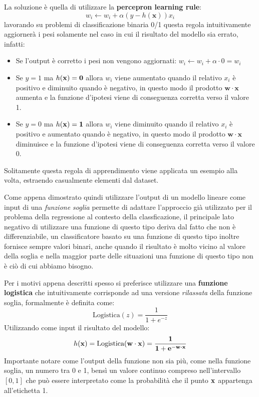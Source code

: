 \documentclass[../../main.tex]{subfiles}
\begin{document}
    La soluzione è quella di utilizzare la \textbf{percepron learning rule}:
    \[w_i \leftarrow w_i + \alpha (y - h(\boldsymbol{x})) x_i\]
    lavorando su problemi di classificazione binaria 0/1 questa regola intuitivamente aggiornerà i pesi solamente nel caso in cui il risultato del modello sia errato, infatti:
    \begin{itemize}
        \item Se l'output è corretto i pesi non vengono aggiornati: $w_i \leftarrow w_i + \alpha \cdot 0 = w_i$
        \item Se $y = 1$ ma $h(\bf{x}) = 0$ allora $w_i$ viene aumentato quando il relativo $x_i$ è positivo e diminuito quando è negativo, in questo modo il prodotto $\boldsymbol{w} \cdot \boldsymbol{x}$ aumenta e la funzione d'ipotesi viene di conseguenza corretta  verso il valore 1.
        \item Se $y = 0$ ma $h(\bf{x}) = 1$ allora $w_i$ viene diminuito quando il relativo $x_i$ è positivo e aumentato quando è negativo, in questo modo il prodotto $\boldsymbol{w} \cdot \boldsymbol{x}$ diminuisce e la funzione d'ipotesi viene di conseguenza corretta verso il valore 0.
    \end{itemize}
    Solitamente questa regola di apprendimento viene applicata un esempio alla volta, estraendo casualmente elementi dal dataset.

    Come appena dimostrato quindi utilizzare l'output di un modello lineare come input di una \textit{funzione soglia} permette di adattare l'approccio già utilizzato per il problema della regressione al contesto della classficazione, il principale lato negativo di utilizzare una funzione di questo tipo deriva dal fatto che non è differenziabile, un classificatore basato su una funzione di questo tipo inoltre fornisce sempre valori binari, anche quando il risultato è molto vicino al valore della soglia e nella maggior parte delle situazioni una funzione di questo tipo non è ciò di cui abbiamo bisogno.

    Per i motivi appena descritti spesso si preferisce utilizzare una \textbf{funzione logistica} che intuitivamente corrisponde ad una versione \textit{rilassata} della funzione soglia, formalmente è definita come:
    \[ \text{Logistica}(z) = \frac{1}{1 + e^{-z}}\]
    Utilizzando come input il risultato del modello:
    \[h(\bf{x}) = \text{Logistica}(\bf{w} \cdot \boldsymbol{x}) = \frac{1}{1 + e^{- \boldsymbol{w \cdot x}}}\]
    Importante notare come l'output della funzione non sia più, come nella funzione soglia, un numero tra 0 e 1, bensì un valore continuo compreso nell'intervallo $[0, 1]$ che può essere interpretato come la probabilità che il punto $\bf{x}$ appartenga all'etichetta 1.
\end{document}

